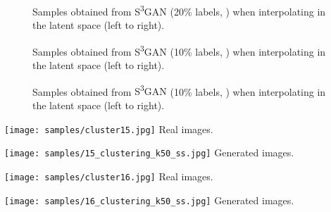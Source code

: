 \documentclass{article}
\newcommand{\tranSSS}{\textsc{S\textsuperscript{3}GAN}}
\newcommand{\tranC}{\textsc{Clustering}}
\begin{document}
\begin{figure}[h]
\centering
{}
\caption{Samples obtained from \tranSSS{} (20\% labels, ) when interpolating in the latent space (left to right).\label{fig:s2-20-4}}
\end{figure}

\begin{figure}[h]
\centering
{}
\caption{Samples obtained from \tranSSS{} (10\% labels, ) when interpolating in the latent space (left to right).\label{fig:s2-20-256-1}}
\end{figure}

\begin{figure}[h]
\centering
{}
\caption{Samples obtained from \tranSSS{} (10\% labels, ) when interpolating in the latent space (left to right).\label{fig:s2-20-256-2}}
\end{figure}


\begin{figure*}[h]
    \centering
    \begin{minipage}{0.45\textwidth}
        \centering
        \texttt{[image: samples/cluster15.jpg]}
        {Real images.}
    \end{minipage}
    \begin{minipage}{0.45\textwidth}
        \centering
        \texttt{[image: samples/15\_clustering\_k50\_ss.jpg]}
        {Generated images.}
    \end{minipage}
    \caption{\label{fig:cluster15samples}Real and generated images () for one of the 50 clusters produced by \tranC{}. Both real and generated images show mostly underwater scenes.}
\end{figure*}

\begin{figure*}
    \centering
    \begin{minipage}{0.45\textwidth}
        \centering
        \texttt{[image: samples/cluster16.jpg]}
        {Real images.}
    \end{minipage}
    \begin{minipage}{0.45\textwidth}
        \centering
        \texttt{[image: samples/16\_clustering\_k50\_ss.jpg]}
        {Generated images.}
    \end{minipage}
    \caption{\label{fig:cluster16samples}Real and generated images () for one of the 50 clusters produced by \tranC{}. Both real and generated images show mostly outdoor scenes featuring different animals.}
\end{figure*}
\end{document}
